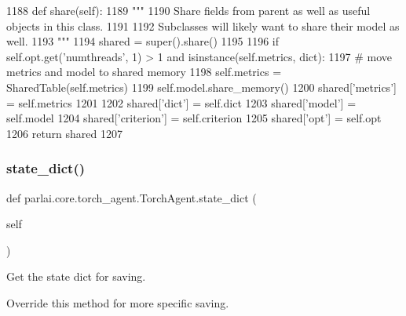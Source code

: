 \begin{DoxyCode}
1188     \textcolor{keyword}{def }share(self):
1189         \textcolor{stringliteral}{"""}
1190 \textcolor{stringliteral}{        Share fields from parent as well as useful objects in this class.}
1191 \textcolor{stringliteral}{}
1192 \textcolor{stringliteral}{        Subclasses will likely want to share their model as well.}
1193 \textcolor{stringliteral}{        """}
1194         shared = super().share()
1195 
1196         \textcolor{keywordflow}{if} self.opt.get(\textcolor{stringliteral}{'numthreads'}, 1) > 1 \textcolor{keywordflow}{and} isinstance(self.metrics, dict):
1197             \textcolor{comment}{# move metrics and model to shared memory}
1198             self.metrics = SharedTable(self.metrics)
1199             self.model.share\_memory()
1200         shared[\textcolor{stringliteral}{'metrics'}] = self.metrics
1201 
1202         shared[\textcolor{stringliteral}{'dict'}] = self.dict
1203         shared[\textcolor{stringliteral}{'model'}] = self.model
1204         shared[\textcolor{stringliteral}{'criterion'}] = self.criterion
1205         shared[\textcolor{stringliteral}{'opt'}] = self.opt
1206         \textcolor{keywordflow}{return} shared
1207 
\end{DoxyCode}
\mbox{\label{classparlai_1_1core_1_1torch__agent_1_1TorchAgent_a9f89e606931a4622a5c6a6f6b832235c}} 
\subsubsection{\texorpdfstring{state\+\_\+dict()}{state\_dict()}}
{\footnotesize\ttfamily def parlai.\+core.\+torch\+\_\+agent.\+Torch\+Agent.\+state\+\_\+dict (\begin{DoxyParamCaption}\item[{}]{self }\end{DoxyParamCaption})}

\begin{DoxyVerb}Get the state dict for saving.

Override this method for more specific saving.
\end{DoxyVerb}
 

